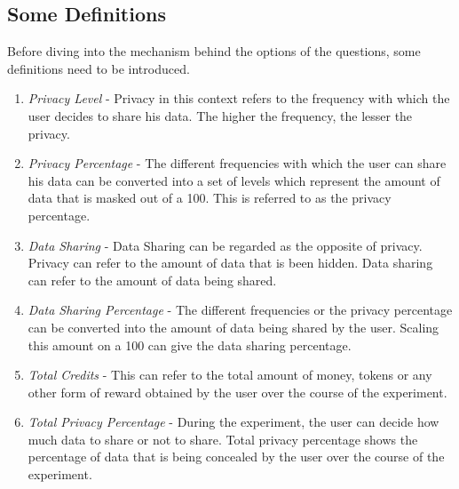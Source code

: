 \subsection{Some Definitions}
Before diving into the mechanism behind the options of the questions, some definitions need to be introduced.
\begin{enumerate}
\item {\it Privacy Level} - Privacy in this context refers to the frequency with which the user decides to share his data. The higher the frequency, the lesser the privacy.
\item {\it Privacy Percentage} - The different frequencies with which the user can share his data can be converted into a set of levels which represent
the amount of data that is masked out of a 100. This is referred to as the privacy percentage.
\item {\it Data Sharing} - Data Sharing can be regarded as the opposite of privacy. Privacy can refer to the amount of data that is been hidden. Data sharing can refer to
the amount of data being shared.
\item {\it Data Sharing Percentage} - The different frequencies or the privacy percentage can be converted into the amount of data being shared by the user. Scaling
this amount on a 100 can give the data sharing percentage.
\item {\it Total Credits} - This can refer to the total amount of money, tokens or any other form of reward obtained by the user over the course of the experiment.
\item {\it Total Privacy Percentage} - During the experiment, the user can decide how much data to share or not to share. Total privacy percentage shows the percentage of data that
is being concealed by the user over the course of the experiment.

\end{enumerate}

